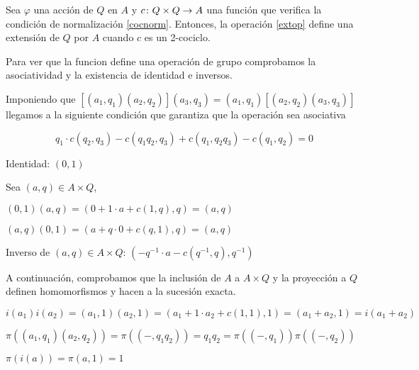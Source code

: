 \begin{proposicion}\label{prop:res1}
Sea $\varphi$ una acción de $Q$ en $A$ y $c\colon Q\times Q\to A$ una función que verifica la condición de normalización \eqref{cocnorm}. Entonces, la operación \eqref{extop} define una extensión de $Q$ por $A$ cuando $c$ es un 2-cociclo.
	\begin{demostracion}
	Para ver que la funcion define una operación de grupo comprobamos la asociatividad y la existencia de identidad e inversos.
	
	Imponiendo que $[(a_1,q_1)(a_2,q_2)](a_3,q_3) = (a_1,q_1)[(a_2,q_2)(a_3,q_3)]$ llegamos a la siguiente condición que garantiza que la operación sea asociativa
	
	
	
	
	
	\begin{equation}\label{eq2coc}	
		 q_1\cdot c(q_2,q_3) - c(q_1q_2,q_3) + c(q_1,q_2q_3) - c(q_1,q_2) = 0
	\end{equation}
	
	Identidad: $(0,1)$
	
	Sea $(a,q)\in A\times Q$,
	
	$(0,1)(a,q) = (0 + 1\cdot a + c(1,q), q) = (a,q)$
	
	$(a,q)(0,1) = (a+q\cdot 0 + c(q,1),q) = (a,q)$
	
	Inverso de $(a,q)\in A\times Q$: $(-q^{-1}\cdot a -c(q^{-1},q),q^{-1})$
	
	A continuación, comprobamos que la inclusión de $A$ a $A\times Q$ y la proyección a $Q$ definen homomorfismos y hacen a la sucesión exacta.
	
	$i(a_1)i(a_2)=(a_1,1)(a_2,1) = (a_1 + 1 \cdot a_2+c(1,1),1) = (a_1+a_2,1)=i(a_1+a_2)$
	
	$\pi((a_1,q_1)(a_2,q_2))=\pi((-,q_1q_2)) = q_1q_2 = \pi((-,q_1))\pi((-,q_2))$
	
	$\pi(i(a)) = \pi(a,1) = 1$
	\end{demostracion}
\end{proposicion}

